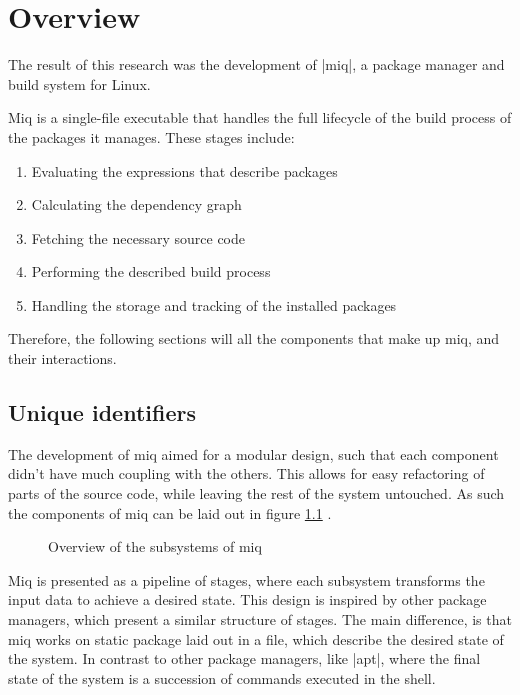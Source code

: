 \chapter{Overview}
\label{chap:overview}

The result of this research was the development of |miq|, a package manager and
build system for Linux.

Miq is a single-file executable that handles the full lifecycle of the build
process of the packages it manages. These stages include:

\begin{enumerate}
    \item Evaluating the expressions that describe packages
    \item Calculating the dependency graph
    \item Fetching the necessary source code
    \item Performing the described build process
    \item Handling the storage and tracking of the installed packages
\end{enumerate}

Therefore, the following sections will all the components that make up miq, and
their interactions.

\section{Unique identifiers}

The development of miq aimed for a modular design, such that
each component didn't have much coupling with the others.
This allows for easy refactoring of parts of the source
code, while leaving the rest of the system untouched. As
such the components of miq can be laid out in figure
\ref{fig:miq-components} .

\begin{figure}[hbtp]
    \centerfloat
    
    \caption{Overview of the subsystems of miq}
    \label{fig:miq-components}
\end{figure}

Miq is presented as a pipeline of stages, where each
subsystem transforms the input data to achieve a desired
state. This design is inspired by other package managers,
which present a similar structure of stages. The main
difference, is that miq works on static package laid out in a file, which describe the desired state of the
system. In contrast to other package managers, like |apt|,
where the final state of the system is a succession of
commands executed in the shell.

